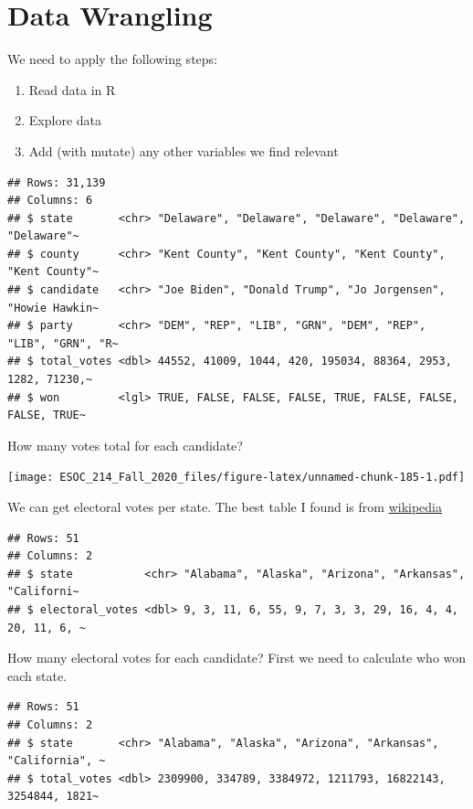\documentclass[
]{book}
\providecommand{\tightlist}{%
  \setlength{\itemsep}{0pt}\setlength{\parskip}{0pt}}
\begin{document}
\hypertarget{data-wrangling-1}{%
\section{Data Wrangling}\label{data-wrangling-1}}

We need to apply the following steps:

\begin{enumerate}
\def\labelenumi{\arabic{enumi}.}
\tightlist
\item
  Read data in R
\item
  Explore data
\item
  Add (with mutate) any other variables we find relevant
\end{enumerate}

\begin{verbatim}
## Rows: 31,139
## Columns: 6
## $ state       <chr> "Delaware", "Delaware", "Delaware", "Delaware", "Delaware"~
## $ county      <chr> "Kent County", "Kent County", "Kent County", "Kent County"~
## $ candidate   <chr> "Joe Biden", "Donald Trump", "Jo Jorgensen", "Howie Hawkin~
## $ party       <chr> "DEM", "REP", "LIB", "GRN", "DEM", "REP", "LIB", "GRN", "R~
## $ total_votes <dbl> 44552, 41009, 1044, 420, 195034, 88364, 2953, 1282, 71230,~
## $ won         <lgl> TRUE, FALSE, FALSE, FALSE, TRUE, FALSE, FALSE, FALSE, TRUE~
\end{verbatim}

How many votes total for each candidate?

\texttt{[image: ESOC\_214\_Fall\_2020\_files/figure-latex/unnamed-chunk-185-1.pdf]}

We can get electoral votes per state. The best table I found is from \href{https://en.wikipedia.org/wiki/United_States_Electoral_College\#:~:text=Electoral\%20votes\%2C\%20out\%20of\%20538,entitled\%20to\%20at\%20least\%203.}{wikipedia}

\begin{verbatim}
## Rows: 51
## Columns: 2
## $ state           <chr> "Alabama", "Alaska", "Arizona", "Arkansas", "Californi~
## $ electoral_votes <dbl> 9, 3, 11, 6, 55, 9, 7, 3, 3, 29, 16, 4, 4, 20, 11, 6, ~
\end{verbatim}

How many electoral votes for each candidate? First we need to calculate who won each state.

\begin{verbatim}
## Rows: 51
## Columns: 2
## $ state       <chr> "Alabama", "Alaska", "Arizona", "Arkansas", "California", ~
## $ total_votes <dbl> 2309900, 334789, 3384972, 1211793, 16822143, 3254844, 1821~
\end{verbatim}
\end{document}

